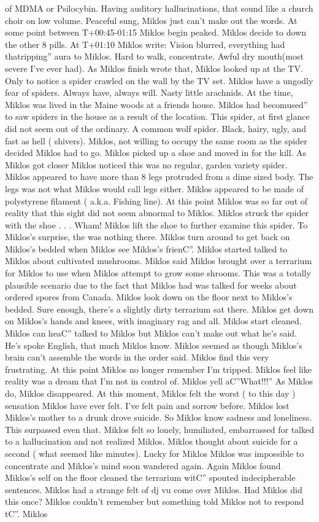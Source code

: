 \documentclass[12pt]{book}
\begin{document}
of MDMA or Psilocybin. Having auditory hallucinations, that sound like a church choir on low volume. Peaceful sung, Miklos just can't make out the words. At some point between T+00:45-01:15 Miklos begin peaked. Miklos decide to down the other 8 pills. At T+01:10 Miklos write: Vision blurred, everything had thatripping'' aura to Miklos. Hard to walk, concentrate. Awful dry mouth(most severe I've ever had). As Miklos finish wrote that, Miklos looked up at the TV. Only to notice a spider crawled on the wall by the TV set. Miklos have a ungodly fear of spiders. Always have, always will. Nasty little arachnids. At the time, Miklos was lived in the Maine woods at a friends house. Miklos had becomused'' to saw spiders in the house as a result of the location. This spider, at first glance did not seem out of the ordinary. A common wolf spider. Black, hairy, ugly, and fast as hell ( shivers). Miklos, not willing to occupy the same room as the spider decided Miklos had to go. Miklos picked up a shoe and moved in for the kill. As Miklos got closer Miklos noticed this was no regular, garden variety spider. Miklos appeared to have more than 8 legs protruded from a dime sized body. The legs was not what Miklos would call legs either. Miklos appeared to be made of polystyrene filament ( a.k.a. Fishing line). At this point Miklos was so far out of reality that this sight did not seem abnormal to Miklos. Miklos struck the spider with the shoe . . . Wham! Miklos lift the shoe to further examine this spider. To Miklos's surprise, the was nothing there. Miklos turn around to get back on Miklos's bedded when Miklos see Miklos's frienC''. Miklos started talked to Miklos about cultivated mushrooms. Miklos said Miklos brought over a terrarium for Miklos to use when Miklos attempt to grow some shrooms. This was a totally plausible scenario due to the fact that Miklos had was talked for weeks about ordered spores from Canada. Miklos look down on the floor next to Miklos's bedded. Sure enough, there's a slightly dirty terrarium sat there. Miklos get down on Miklos's hands and knees, with imaginary rag and all. Miklos start cleaned. Miklos can heaC'' talked to Miklos but Miklos can't make out what he's said. He's spoke English, that much Miklos know. Miklos seemed as though Miklos's brain can't assemble the words in the order said. Miklos find this very frustrating. At this point Miklos no longer remember I'm tripped. Miklos feel like reality was a dream that I'm not in control of. Miklos yell aC''What!!!'' As Miklos do, Miklos disappeared. At this moment, Miklos felt the worst ( to this day ) sensation Miklos have ever felt. I've felt pain and sorrow before. Miklos lost Miklos's mother to a drunk drove suicide. So Miklos know sadness and loneliness. This surpassed even that. Miklos felt so lonely, humiliated, embarrassed for talked to a hallucination and not realized Miklos. Miklos thought about suicide for a second ( what seemed like minutes). Lucky for Miklos Miklos was impossible to concentrate and Miklos's mind soon wandered again. Again Miklos found Miklos's self on the floor cleaned the terrarium witC'' spouted indecipherable sentences. Miklos had a strange felt of dj vu come over Miklos. Had Miklos did this once? Miklos couldn't remember but something told Miklos not to respond tC''. Miklos 
\end{document}
